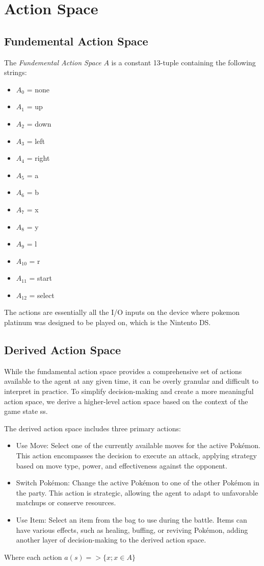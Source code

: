\section{Action Space}

\subsection{Fundemental Action Space}

The \emph{Fundemental Action Space} $A$ is a constant 13-tuple containing the following strings:
\begin{itemize}
    \item $A_{0}$  = none
    \item $A_{1}$  = up
    \item $A_{2}$  = down
    \item $A_{3}$  = left
    \item $A_{4}$  = right
    \item $A_{5}$  = a
    \item $A_{6}$  = b
    \item $A_{7}$  = x
    \item $A_{8}$  = y
    \item $A_{9}$  = l
    \item $A_{10}$ = r
    \item $A_{11}$ = start
    \item $A_{12}$ = select
\end{itemize}

The actions are essentially all the I/O inputs on the device where pokemon platinum was designed to be played on, which is the Nintento DS.

\subsection{Derived Action Space}

While the fundamental action space provides a comprehensive set of actions available to the agent at any given time, it can be overly granular and difficult to interpret in practice. To simplify decision-making and create a more meaningful action space, we derive a higher-level action space based on the context of the game state ss.

The derived action space includes three primary actions:
\begin{itemize}
    \item Use Move: Select one of the currently available moves for the active Pokémon. This action encompasses the decision to execute an attack, applying strategy based on move type, power, and effectiveness against the opponent.
    \item Switch Pokémon: Change the active Pokémon to one of the other Pokémon in the party. This action is strategic, allowing the agent to adapt to unfavorable matchups or conserve resources.
    \item Use Item: Select an item from the bag to use during the battle. Items can have various effects, such as healing, buffing, or reviving Pokémon, adding another layer of decision-making to the derived action space.
\end{itemize}

Where each action $a(s) => \{ x; x \in A \}$